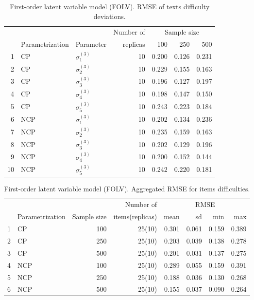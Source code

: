 %
\begin{table}[H]
	\centering
	\begin{tabular}{rllrrrr}
		\hline
		\multicolumn{3}{c}{ } & Number of &\multicolumn{3}{c}{ Sample size } \\ 
		\cmidrule(rl){5-7}
		& Parametrization & Parameter & replicas & 100 & 250 & 500 \\  
		\hline\hline
		1 & CP & $\sigma^{(3)}_{1}$ &   10 & 0.200 & 0.126 & 0.231 \\ 
		2 & CP & $\sigma^{(3)}_{2}$ &   10 & 0.229 & 0.155 & 0.163 \\ 
		3 & CP & $\sigma^{(3)}_{3}$ &   10 & 0.196 & 0.127 & 0.197 \\ 
		4 & CP & $\sigma^{(3)}_{4}$ &   10 & 0.198 & 0.147 & 0.150 \\ 
		5 & CP & $\sigma^{(3)}_{5}$ &   10 & 0.243 & 0.223 & 0.184 \\ 
		\hline
		6 & NCP & $\sigma^{(3)}_{1}$ &   10 & 0.202 & 0.134 & 0.236 \\ 
		7 & NCP & $\sigma^{(3)}_{2}$ &   10 & 0.235 & 0.159 & 0.163 \\ 
		8 & NCP & $\sigma^{(3)}_{3}$ &   10 & 0.202 & 0.129 & 0.196 \\ 
		9 & NCP & $\sigma^{(3)}_{4}$ &   10 & 0.200 & 0.152 & 0.144 \\ 
		10 & NCP & $\sigma^{(3)}_{5}$ &   10 & 0.242 & 0.220 & 0.181 \\ 
		\hline
	\end{tabular}
	\caption[First-order latent variable model (FOLV). RMSE of texts difficulty deviations.]%
	{First-order latent variable model (FOLV). RMSE of texts difficulty deviations.}
	\label{tab:FOLV_RMSE_texts_dev}
\end{table}
%
\begin{table}[ht]
	\centering
	\begin{tabular}{rlrrrrrr}
		\hline
		\multicolumn{3}{c}{ } & Number of &\multicolumn{4}{c}{ RMSE } \\ 
		\cmidrule(rl){5-8}
		& Parametrization & Sample size & items(replicas) & mean & sd & min & max \\  
		\hline\hline
		1 & CP &  100 & 25(10) & 0.301 & 0.061 & 0.159 & 0.389 \\ 
		2 & CP &  250 & 25(10) & 0.203 & 0.039 & 0.138 & 0.278 \\ 
		3 & CP &  500 & 25(10) & 0.201 & 0.031 & 0.137 & 0.275 \\ 
		\hline
		4 & NCP &  100 & 25(10) & 0.289 & 0.055 & 0.159 & 0.391 \\ 
		5 & NCP &  250 & 25(10) & 0.188 & 0.036 & 0.130 & 0.268 \\ 
		6 & NCP &  500 & 25(10) & 0.155 & 0.037 & 0.090 & 0.264 \\ 
		\hline
	\end{tabular}
	\caption[First-order latent variable model (FOLV). Aggregated RMSE for items difficulties.]%
	{First-order latent variable model (FOLV). Aggregated RMSE for items difficulties.}
	\label{tab:FOLV_RMSE_items}
\end{table}



